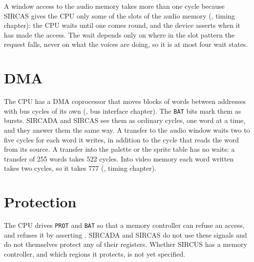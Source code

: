 A window access to the audio memory takes more than one cycle because SIRCAS gives the CPU only some of the slots of
the audio memory (\audiomanual{}, timing chapter): the CPU waits until one comes round, and the device asserts
 when it has made the access. The wait depends only on where in the slot pattern the request falls,
never on what the voices are doing, so it is at most four wait states.

\section{DMA}

The CPU has a DMA coprocessor that moves blocks of words between addresses with bus cycles of its own (\hwmanual{}, bus
interface chapter). The \texttt{BAT} bits mark them as bursts. SIRCADA and SIRCAS see them as ordinary cycles, one word
at a time, and they answer them the same way. A transfer to the audio window waits two to five cycles for each word it
writes, in addition to the cycle that reads the word from its source. A transfer into the palette or the sprite table
has no waits: a transfer of 255 words takes 522 cycles. Into video memory each word written takes two cycles, so it
takes 777 (\videomanual{}, timing chapter).

\section{Protection}

The CPU drives \texttt{PROT} and \texttt{BAT} so that a memory controller can refuse an access, and refuses it by
asserting . SIRCADA and SIRCAS do not use these signals and do not themselves protect any of their
registers. Whether SIRCUS has a memory controller, and which regions it protects, is not yet specified.
